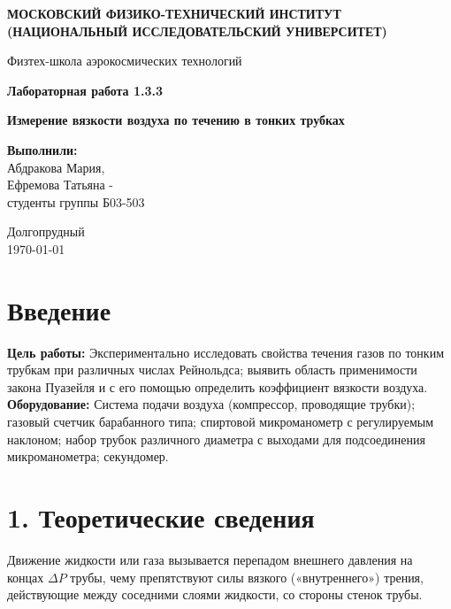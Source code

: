 \documentclass[a4paper]{article}
\begin{document}
	\begin{titlepage}
		\begin{center}
			\textbf{МОСКОВСКИЙ ФИЗИКО-ТЕХНИЧЕСКИЙ ИНСТИТУТ}\\
			\textbf{(НАЦИОНАЛЬНЫЙ ИССЛЕДОВАТЕЛЬСКИЙ УНИВЕРСИТЕТ)}
			
			\vspace{1cm}
			Физтех-школа аэрокосмических технологий
			
			\vspace{2cm}
			{\LARGE \textbf{Лабораторная работа 1.3.3}}
			
			\vspace{1cm}
			{\Large \textbf{Измерение вязкости воздуха по течению в тонких трубках}}
			
			\vfill
			
			\begin{flushright}
				\large
				\textbf{Выполнили:} \\
				Абдракова Мария,\\
				Ефремова Татьяна - \\
				студенты группы Б03-503\\
			\end{flushright}
			
			\vspace{1cm}
			
			\begin{center}
				Долгопрудный \\
				\today
			\end{center}
		\end{center}
	\end{titlepage}
	\newpage   
	\section*{Введение}
	\textbf{Цель работы:} Экспериментально исследовать свойства течения газов по тонким трубкам при различных числах Рейнольдса; выявить область применимости закона Пуазейля и с его помощью определить коэффициент вязкости воздуха.\\
	
	\textbf{Оборудование:} Система подачи воздуха (компрессор, проводящие трубки); газовый счетчик барабанного типа; спиртовой микроманометр с регулируемым наклоном; набор трубок различного диаметра с выходами для подсоединения микроманометра; секундомер.
	
	\section*{1. Теоретические сведения}
	\quad Движение жидкости или газа вызывается перепадом внешнего давления на концах $\Delta P$ трубы, чему препятствуют силы вязкого («внутреннего») трения, действующие между соседними слоями жидкости, со стороны стенок трубы.\\
	
\end{document}
